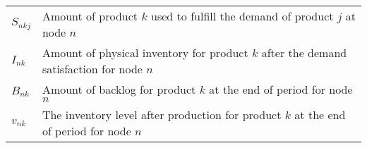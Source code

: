 \documentclass[10pt]{article}
\newcommand{\ti}{t} %
\newcommand{\TI}{\mathcal{T}}
\newcommand{\ka}{k} %
\newcommand{\jey}{j} %
\newcommand{\Bi}{B} %
\newcommand{\Vi}{v} %
\newcommand{\Es}{S} %
\newcommand{\InvPos}{inventory level after production }
\newcommand{\Csub}{\mathcal{K}^+_k}
\newcommand{\Psub}{\mathcal{K}^-_k}
\begin{document}
\begin{table}[H]
\begin{adjustbox}{width=1\textwidth,center=\textwidth}
\begin{tabular}{ll}
$\Es_{n \ka \jey}$ & Amount of product $\ka$  used to fulfill the demand of product $\jey$  at  node $n$   \\
${I}_{n \ka}$ & Amount of physical inventory for product $k$ after the demand satisfaction for node $n$  \\
${\Bi}_{n \ka}$ & Amount of backlog for product $k$ at the end of period for node $n$  \\
${\Vi}_{n \ka}$ & The \InvPos for product $\ka$ at the end of period for node $n$  \\
 \bottomrule
\end{tabular}
\end{adjustbox}
 \label{tab:Sub_parameters}
\end{table}





 
 











\end{document}
